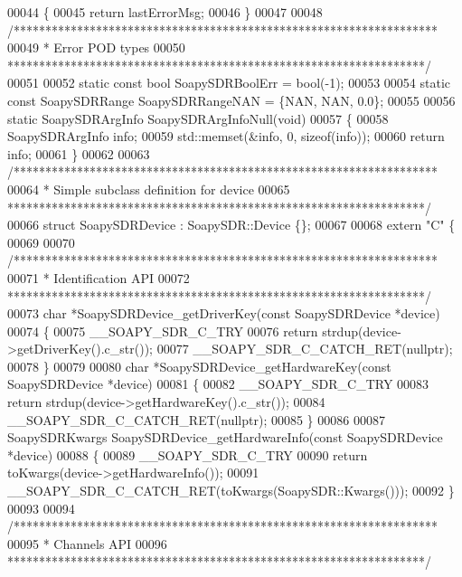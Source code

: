 \begin{DoxyCode}
00044 \{
00045     \textcolor{keywordflow}{return} lastErrorMsg;
00046 \}
00047 
00048 \textcolor{comment}{/*******************************************************************}
00049 \textcolor{comment}{ * Error POD types}
00050 \textcolor{comment}{ ******************************************************************/}
00051 
00052 \textcolor{keyword}{static} \textcolor{keyword}{const} \textcolor{keywordtype}{bool} SoapySDRBoolErr = bool(-1);
00053 
00054 \textcolor{keyword}{static} \textcolor{keyword}{const} SoapySDRRange SoapySDRRangeNAN = \{NAN, NAN, 0.0\};
00055 
00056 \textcolor{keyword}{static} SoapySDRArgInfo SoapySDRArgInfoNull(\textcolor{keywordtype}{void})
00057 \{
00058     SoapySDRArgInfo info;
00059     std::memset(&info, 0, \textcolor{keyword}{sizeof}(info));
00060     \textcolor{keywordflow}{return} info;
00061 \}
00062 
00063 \textcolor{comment}{/*******************************************************************}
00064 \textcolor{comment}{ * Simple subclass definition for device}
00065 \textcolor{comment}{ ******************************************************************/}
00066 \textcolor{keyword}{struct }SoapySDRDevice : SoapySDR::Device \{\};
00067 
00068 \textcolor{keyword}{extern} \textcolor{stringliteral}{"C"} \{
00069 
00070 \textcolor{comment}{/*******************************************************************}
00071 \textcolor{comment}{ * Identification API}
00072 \textcolor{comment}{ ******************************************************************/}
00073 \textcolor{keywordtype}{char} *SoapySDRDevice_getDriverKey(\textcolor{keyword}{const} SoapySDRDevice *device)
00074 \{
00075     __SOAPY_SDR_C_TRY
00076     \textcolor{keywordflow}{return} strdup(device->getDriverKey().c\_str());
00077     __SOAPY_SDR_C_CATCH_RET(\textcolor{keyword}{nullptr});
00078 \}
00079 
00080 \textcolor{keywordtype}{char} *SoapySDRDevice_getHardwareKey(\textcolor{keyword}{const} SoapySDRDevice *device)
00081 \{
00082     __SOAPY_SDR_C_TRY
00083     \textcolor{keywordflow}{return} strdup(device->getHardwareKey().c\_str());
00084     __SOAPY_SDR_C_CATCH_RET(\textcolor{keyword}{nullptr});
00085 \}
00086 
00087 SoapySDRKwargs SoapySDRDevice_getHardwareInfo(\textcolor{keyword}{const} SoapySDRDevice *device)
00088 \{
00089     __SOAPY_SDR_C_TRY
00090     \textcolor{keywordflow}{return} toKwargs(device->getHardwareInfo());
00091     __SOAPY_SDR_C_CATCH_RET(toKwargs(SoapySDR::Kwargs()));
00092 \}
00093 
00094 \textcolor{comment}{/*******************************************************************}
00095 \textcolor{comment}{ * Channels API}
00096 \textcolor{comment}{ ******************************************************************/}

\end{DoxyCode}
